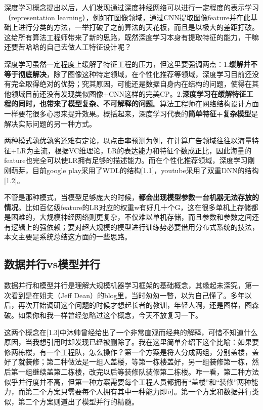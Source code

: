\documentclass[12pt]{article}
\begin{document}
深度学习概念提出以后，人们发现通过深度神经网络可以进行一定程度的表示学习（representation learning），例如在图像领域，通过CNN提取图像feature并在此基础上进行分类的方法，一举打破了之前算法的天花板，而且是以极大的差距打破。这给所有算法工程师带来了新的思路，既然深度学习本身有提取特征的能力，干嘛还要苦哈哈的自己去做人工特征设计呢？

深度学习虽然一定程度上缓解了特征工程的压力，但这里要强调两点：1.\textbf{缓解并不等于彻底解决}，除了图像这种特定领域，在个性化推荐等领域，深度学习目前还没有完全取得绝对的优势；究其原因，可能还是数据自身内在结构的问题，使得在其他领域目前还没有发现类似图像+CNN这样的完美CP。2.\textbf{深度学习在缓解特征工程的同时，也带来了模型复杂、不可解释的问题}。算法工程师在网络结构设计方面一样要花很多心思来提升效果。概括起来，深度学习代表的\textbf{简单特征+复杂模型}是解决实际问题的另一种方式。

两种模式孰优孰劣还难有定论，以点击率预测为例，在计算广告领域往往以海量特征+LR为主流，根据VC维理论，LR的表达能力和特征个数成正比，因此海量的feature也完全可以使LR拥有足够的描述能力。而在个性化推荐领域，深度学习刚刚萌芽，目前google play采用了WDL的结构[1.1]，youtube采用了双重DNN的结构[1.2]。

不管是那种模式，当模型足够庞大的时候，\textbf{都会出现模型参数一台机器无法存放的情况}。比如百亿级feature的LR对应的权重w有好几十个G，这在很多单机上存储都是困难的，大规模神经网络则更复杂，不仅难以单机存储，而且参数和参数之间还有逻辑上的强依赖；要对超大规模的模型进行训练势必要借用分布式系统的技法，本文主要是系统总结这方面的一些思路。

\subsection{数据并行vs模型并行}
数据并行和模型并行是理解大规模机器学习框架的基础概念，其缘起未深究，第一次看到是在姐夫（Jeff Dean）的blog里，当时匆匆一瞥，以为自己懂了。多年以后，再次开始调研这个问题的时候才想起长者的教训，年轻人啊，还是图样，图森破。如果你和我一样曾经忽略过这个概念，今天不放复习一下。

这两个概念在[1.3]中沐帅曾经给出了一个非常直观而经典的解释，可惜不知道什么原因，当我想引用时却发现已经被删除了。我在这里简单介绍下这个比喻：如果要修两栋楼，有一个工程队，怎么操作？第一个方案是将人分成两组，分别盖楼，盖好了就装修；第二种做法是一组人盖楼，等第一栋楼盖好，另一组装修第一栋，然后第一组继续盖第二栋楼，改完以后等装修队装修第二栋楼。咋一看，第二种方法似乎并行度并不高，但第一种方案需要每个工程人员都拥有“盖楼”和“装修”两种能力，而第二个方案只需要每个人拥有其中一种能力即可。第一个方案和数据并行类似，第二个方案则道出了模型并行的精髓。
\end{document}
